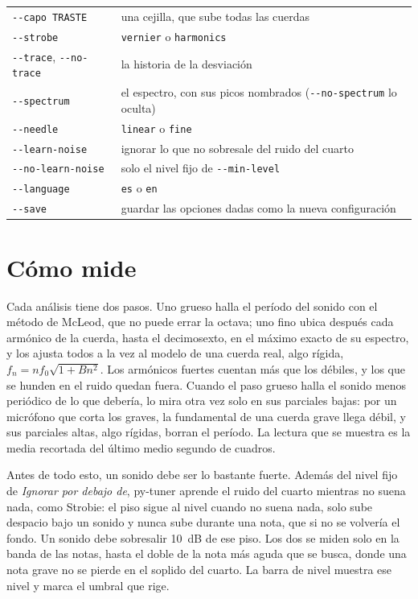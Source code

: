 \documentclass[12pt,
              article,
              oneside
              ]{memoir}
\newcommand*{\menu}[1]{\textit{#1}}
\begin{document}
\begin{longtable}{@{}lp{}@{}}
\texttt{-{}-capo TRASTE} & una cejilla, que sube todas las cuerdas\\
\texttt{-{}-strobe} & \texttt{vernier} o \texttt{harmonics}\\
\texttt{-{}-trace}, \texttt{-{}-no-trace} & la historia de la desviación\\
\texttt{-{}-spectrum} & el espectro, con sus picos nombrados (\texttt{-{}-no-spectrum} lo oculta)\\
\texttt{-{}-needle} & \texttt{linear} o \texttt{fine}\\
\texttt{-{}-learn-noise} & ignorar lo que no sobresale del ruido del cuarto\\
\texttt{-{}-no-learn-noise} & solo el nivel fijo de \texttt{-{}-min-level}\\
\texttt{-{}-language} & \texttt{es} o \texttt{en}\\
\texttt{-{}-save} & guardar las opciones dadas como la nueva configuración\\
\bottomrule
\end{longtable}

\section{Cómo mide}
\label{sec:how}

%
Cada análisis tiene dos pasos. Uno grueso halla el período del sonido con
el método de McLeod, que no puede errar la octava; uno fino ubica después
cada armónico de la cuerda, hasta el decimosexto, en el máximo exacto de su
espectro, y los ajusta todos a la vez al modelo de una cuerda real, algo
rígida, $f_n = n f_0 \sqrt{1 + B n^2}$. Los armónicos fuertes cuentan más
que los débiles, y los que se hunden en el ruido quedan fuera. Cuando el
paso grueso halla el sonido menos periódico de lo que debería, lo mira otra
vez solo en sus parciales bajas: por un micrófono que corta los graves, la
fundamental de una cuerda grave llega débil, y sus parciales altas, algo
rígidas, borran el período. La lectura que se muestra es la media recortada
del último medio segundo de cuadros.

%
Antes de todo esto, un sonido debe ser lo bastante fuerte. Además del
nivel fijo de \menu{Ignorar por debajo de}, py-tuner aprende el ruido del
cuarto mientras no suena nada, como Strobie: el piso sigue al nivel cuando
no suena nada, solo sube despacio bajo un sonido y nunca sube durante una
nota, que si no se volvería el fondo. Un sonido debe sobresalir 10~dB de
ese piso. Los dos se miden solo en la banda de las notas, hasta el doble de
la nota más aguda que se busca, donde una nota grave no se pierde en el
soplido del cuarto. La barra de nivel muestra ese nivel y marca el umbral
que rige.
\end{document}
